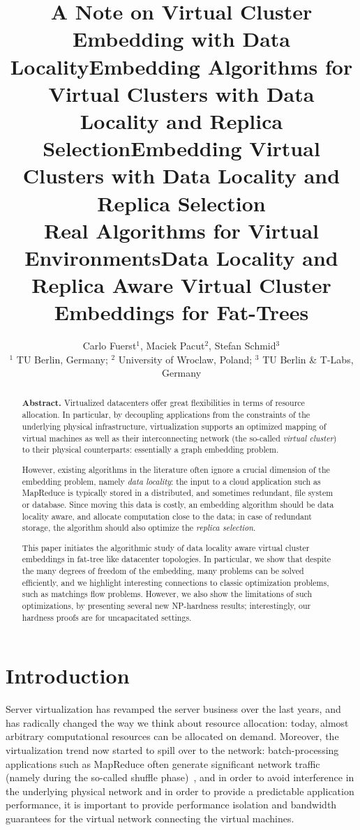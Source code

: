 \documentclass[9pt,twocolumn]{scrartcl}
\title{A Note on Virtual Cluster Embedding with Data Locality}
\title{Embedding Algorithms for Virtual Clusters with Data Locality and Replica Selection}
\title{Embedding Virtual Clusters with Data Locality and Replica Selection\\{\Large Real Algorithms for Virtual Environments}}
\title{Data Locality and Replica Aware Virtual Cluster Embeddings for Fat-Trees}
\author{Carlo Fuerst$^1$, Maciek Pacut$^2$, Stefan Schmid$^3$\\
$^1$ TU Berlin, Germany; $^2$ University of Wroclaw, Poland; $^3$ TU Berlin \& T-Labs, Germany}
\begin{document}
\maketitle


\begin{abstract}
\textbf{Abstract.} Virtualized datacenters offer great flexibilities in terms of resource allocation. In particular, by
decoupling applications from the constraints of the underlying physical infrastructure, virtualization
supports an optimized mapping of virtual machines as well as their interconnecting network (the so-called \emph{virtual cluster}) to their
physical counterparts: essentially a graph embedding problem.

However, existing algorithms
in the literature often ignore a crucial dimension of the embedding problem, namely \emph{data locality}:
the input to a cloud application such as MapReduce is typically stored in a distributed,
and sometimes redundant, file system or database. Since moving this data is costly, an embedding algorithm should be data locality aware,
and allocate computation close to the data; in case of redundant storage, the algorithm should also optimize the \emph{replica selection}.

This paper initiates the algorithmic study of data locality aware virtual cluster embeddings in fat-tree like datacenter topologies.
In particular, we
show that
despite the many degrees of freedom of the embedding, many problems can be
solved efficiently, and we highlight interesting connections
to classic optimization problems, such as matchings
flow problems. However, we also show the limitations of such optimizations,
by presenting several new NP-hardness results; interestingly,
our hardness proofs are for uncapacitated settings.
\end{abstract}

\section{Introduction}

Server virtualization has revamped the server business over the last years,
and has radically changed the way we think about resource allocation:
today, almost arbitrary computational resources can be allocated on demand.
Moreover, the virtualization trend now started to spill over to the network:
batch-processing applications such as MapReduce often generate significant
network traffic (namely during the so-called shuffle phase)~\cite{amazonbw},
and in order to avoid interference in the underlying physical network and in order to provide a predictable
application performance, it is important to provide performance isolation and bandwidth guarantees
for the virtual network connecting the virtual machines.~\cite{talk-about}
\end{document}
